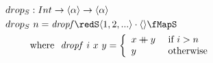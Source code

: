 \documentclass[preview]{standalone}
\begin{document}
\begin{align*}
  drop_S &: Int \rightarrow \vect{\alpha} \rightarrow \vect{\alpha} \\
  drop_S &\ n = \mathit{dropf} \redS \vect{1,2,...} \cdot \vect{} \fMapS\\
         & \text{where}\ \ \mathit{dropf}\ i\ x\ y = 
           \left\{\begin{array}{ll}
                    x \fcat y & \text{ if } i > n\\
                    y & \text{ otherwise}
                  \end{array}
           \right.\\
\end{align*}
\end{document}
